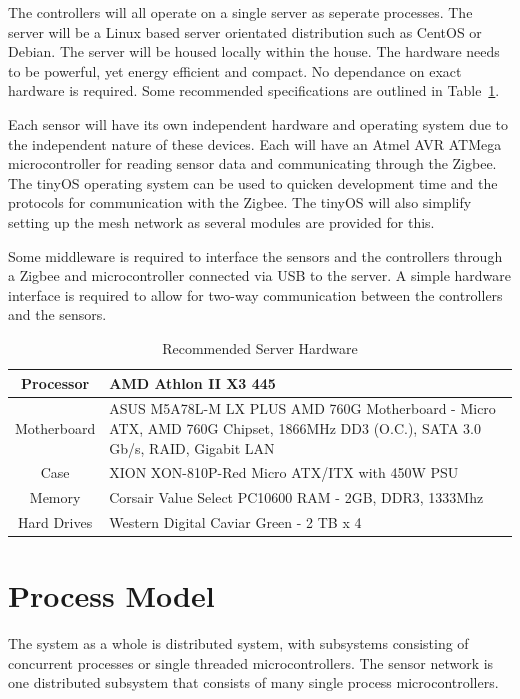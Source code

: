 \documentclass{report}
\begin{document}
The controllers will all operate on a single server as seperate processes. The
server will be a Linux based server orientated distribution such as CentOS or
Debian. The server will be housed locally within the house. The hardware needs
to be powerful, yet energy efficient and compact. No dependance on exact
hardware is required. Some recommended specifications are outlined in
Table~\ref{server_hardware}.

Each sensor will have its own independent hardware and operating system due to
the independent nature of these devices. Each will have an Atmel AVR ATMega
microcontroller for reading sensor data and communicating through the Zigbee.
The tinyOS operating system can be used to quicken development time and the
protocols for communication with the Zigbee. The tinyOS will also simplify
setting up the mesh network as several modules are provided for this.

Some middleware is required to interface the sensors and the controllers
through a Zigbee and microcontroller connected via USB to the server. A simple
hardware interface is required to allow for two-way communication between the
controllers and the sensors.

\begin{table}[h]
    \caption{Recommended Server Hardware}
    \label{server_hardware}
    \centering
    \begin{tabular}{| c | p{5cm} |}
    \hline
    Processor & AMD Athlon II X3 445 \\ \hline
    Motherboard & ASUS M5A78L-M LX PLUS AMD 760G Motherboard - Micro ATX,
    AMD 760G Chipset, 1866MHz DD3 (O.C.), SATA 3.0 Gb/s, RAID, Gigabit LAN \\
    \hline
    Case &  XION XON-810P-Red Micro ATX/ITX with 450W PSU \\ \hline
    Memory & Corsair Value Select PC10600 RAM - 2GB, DDR3, 1333Mhz \\ \hline
    Hard Drives & Western Digital Caviar Green - 2 TB x 4 \\
    \hline
    \end{tabular}
\end{table}


\section{Process Model}
The system as a whole is distributed system, with subsystems consisting of
concurrent processes or single threaded microcontrollers. The sensor network is
one distributed subsystem that consists of many single process
microcontrollers. 
\end{document}
